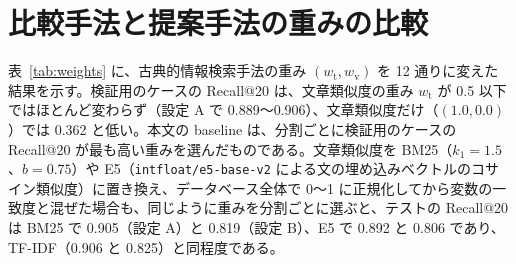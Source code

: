 \documentclass[11pt,a4paper]{ltjsarticle}
\begin{document}
\appendix
\def\thesection{付録 \Alph{section}}
\section{比較手法と提案手法の重みの比較}\label{app:weights}
表~\ref{tab:weights} に、古典的情報検索手法の重み $(w_{\mathrm{t}}, w_{\mathrm{v}})$ を 12 通りに変えた結果を示す。検証用のケースの Recall@20 は、文章類似度の重み $w_{\mathrm{t}}$ が 0.5 以下ではほとんど変わらず（設定 A で 0.889〜0.906）、文章類似度だけ（$(1.0, 0.0)$）では 0.362 と低い。本文の baseline は、分割ごとに検証用のケースの Recall@20 が最も高い重みを選んだものである。文章類似度を BM25（$k_1 = 1.5$、$b = 0.75$）や E5（\texttt{intfloat/e5-base-v2} による文の埋め込みベクトルのコサイン類似度）に置き換え、データベース全体で 0〜1 に正規化してから変数の一致度と混ぜた場合も、同じように重みを分割ごとに選ぶと、テストの Recall@20 は BM25 で 0.905（設定 A）と 0.819（設定 B）、E5 で 0.892 と 0.806 であり、TF-IDF（0.906 と 0.825）と同程度である。
\end{document}
